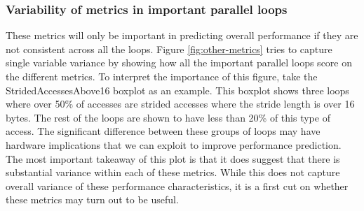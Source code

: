 \documentclass[12pt,twoside]{reedthesis}
\begin{document}
		\subsubsection{Variability of metrics in important parallel loops}
		
		These metrics will only be important in predicting overall performance if they are not consistent across all the loops. Figure \ref{fig:other-metrics} tries to capture single variable variance by showing how all the important parallel loops score on the different metrics. 
		To interpret the importance of this figure, take the StridedAccessesAbove16 boxplot as an example. This boxplot shows three loops where over 50\% of accesses are strided accesses where the stride length is over 16 bytes. The rest of the loops are shown to have less than 20\% of this type of access. The significant difference between these groups of loops may have hardware implications that we can exploit to improve performance prediction.
		The most important takeaway of this plot is that it does suggest that there is substantial variance within each of these metrics. 
		While this does not capture overall variance of these performance characteristics, it is a first cut on whether these metrics may turn out to be useful. 
		
		
		
\end{document}
